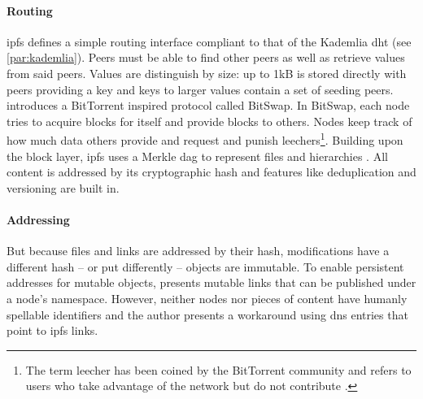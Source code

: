 \paragraph{Routing}
\gls{ipfs} defines a simple routing interface compliant to that of the Kademlia \gls{dht} (see \vref{par:kademlia}). Peers must be able to find other peers as well as retrieve values from said peers. Values are distinguish by size: up to 1kB is stored directly with peers providing a key and keys to larger values contain a set of seeding peers. \citet[\S3.5{ipfs-whitepaper} notes "different use cases will call for substantially different routing systems (e.g. DHT in wide network, static HT in local network)". To that end, the routing implementation should be exchangeable.

\paragraph{Data Distribution}
Files in \gls{ipfs} are defined made up of two abstraction layers. The lower layer consists of blocks of arbitrary binary data. \citet[\S3.4]{ipfs-whitepaper} introduces a BitTorrent inspired protocol called BitSwap. In BitSwap, each node tries to acquire blocks for itself and provide blocks to others. Nodes keep track of how much data others provide and request and punish leechers\footnote{The term leecher has been coined by the BitTorrent community and refers to users who take advantage of the network but do not contribute \cite[\S7.5]{tanenbaum_wetherall_2011}.}. Building upon the block layer, \gls{ipfs} uses a Merkle \gls{dag} to represent files and hierarchies \cite[\S3.5]{ipfs-whitepaper}. All content is addressed by its cryptographic hash \cite{content-centric-networking} and features like deduplication and versioning are built in.

\paragraph{Addressing}
But because files and links are addressed by their hash, modifications have a different hash – or put differently – objects are immutable. To enable persistent addresses for mutable objects, \citet[\S3.7]{ipfs-whitepaper} presents mutable links that can be published under a node's namespace. However, neither nodes nor pieces of content have humanly spellable identifiers and the author presents a workaround using \gls{dns} entries that point to \gls{ipfs} links.

